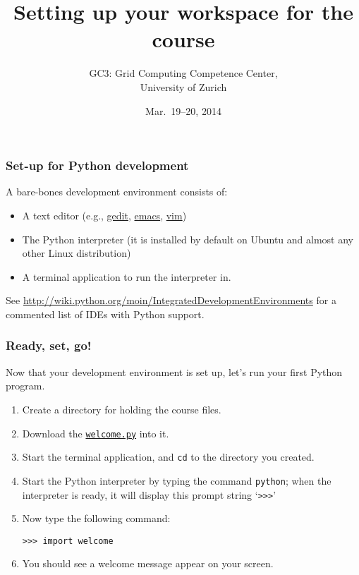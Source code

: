 \documentclass[english,serif,mathserif,xcolor=pdftex,dvipsnames,table]{beamer}
\title[Set-up]{%
  Setting up your workspace for the course
}
\author[GC3]{%
  GC3: Grid Computing Competence Center, \\
  University of Zurich
}
\date{Mar.~19--20, 2014}
\begin{document}
\maketitle


\begin{frame}
  \frametitle{Set-up for Python development}
  A bare-bones development environment consists of:
  \begin{itemize}
  \item A text editor (e.g.,
    \href{http://en.wikipedia.org/wiki/Gedit}{gedit},
    \href{http://hide1713.wordpress.com/2009/01/30/setup-perfect-python-environment-in-emacs/}{emacs},
    \href{http://blog.dispatched.ch/2009/05/24/vim-as-python-ide/}{vim})
  \item The Python interpreter (it is installed by default on
    Ubuntu and almost any other Linux distribution)
  \item A terminal application to run the interpreter in.
  \end{itemize}

  \+ See
  {\small \url{http://wiki.python.org/moin/IntegratedDevelopmentEnvironments}}
  for a commented list of {IDEs} with Python support.
\end{frame}


\begin{frame}[fragile]
  \frametitle{Ready, set, go!}

  Now that your development environment is set up, let's run your
  first Python program.
  \begin{enumerate}
  \item Create a directory for holding the course files.
  \item Download the \href{http://www.gc3.uzh.ch/welcome.py}{\texttt{welcome.py}} into it.
  \item Start the terminal application, and \texttt{cd} to the directory you created.
  \item Start the Python interpreter by typing the command \texttt{python}; when the interpreter is ready, it will display this prompt string `\texttt{>>>}'
  \item Now type the following command:
    \begin{lstlisting}
>>> import welcome
    \end{lstlisting}
  \item You should see a welcome message appear on your screen.
  \end{enumerate}

\end{frame}
\end{document}
